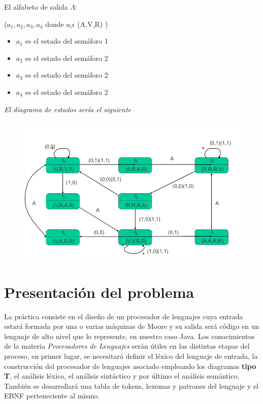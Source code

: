 \documentclass[12pt,a4paper]{article}
\begin{document}
El alfabeto de salida $\Lambda$: { ($a_{1},a_{2},a_{3},a_{4}$ donde $a_{i}\epsilon$ (A,V,R) )
	\begin{itemize}
		\item $a_{1}$ es el estado del semáforo 1
		\item $a_{2}$ es el estado del semáforo 2
		\item $a_{3}$ es el estado del semáforo 2
		\item $a_{4}$ es el estado del semáforo 2
	\end{itemize}

	\begin{center}
		\textit{El diagrama de estados sería el siguiente}
	\end{center}

	\begin{figure}[h]
		\centering
		\includegraphics[width=0.7
		\linewidth]{img/3}
		\caption{}
		\label{fig:3}
	\end{figure}

\newpage
\section{Presentación del problema}
La práctica consiste en el diseño de un procesador de lenguajes cuya entrada estará formada por una o varias máquinas de Moore y su salida será código en un lenguaje de alto nivel que lo represente, en nuestro caso Java.
\newline
\newline
Los conocimientos de la materia \textit{Procesadores de Lenguajes} serán útiles en las distintas etapas del proceso, en primer lugar, se necesitará definir el léxico del lenguaje de entrada, la construcción del procesador de lenguajes asociado empleando los diagramas \textbf{tipo T}, el análisis léxico, el análisis sintáctico y por último el análisis semántico.
\newline
\newline
También se desarrollará una tabla de tokens, lexemas y patrones del lenguaje y el EBNF perteneciente al mismo.
}
\end{document}
